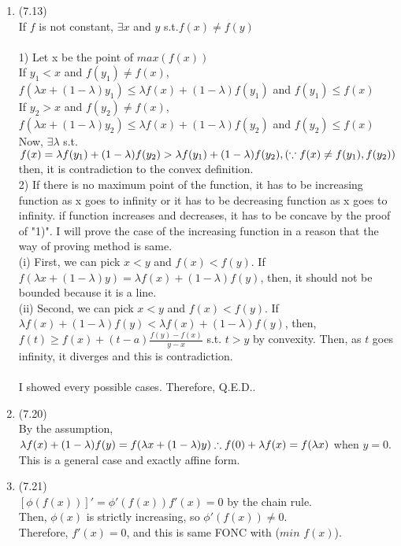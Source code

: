 \documentclass[letterpaper,12pt]{article}
\theoremstyle{definition}
\begin{document}
\begin{enumerate}
	\item (7.13) \\
If $f$ is not constant, $\exists x$ and $y $ s.t.$  f(x) \neq f(y)$\\ \\
1) Let x be the point of $max(f(x))$\\
If  $y_1 < x$ and $f(y_1) \neq f(x)$, $f(\lambda x + (1-\lambda)y_1) \leq \lambda f(x) + (1-\lambda) f(y_1)$ and $f(y_1) \leq f(x) $\\
If $y_2 > x$ and $ f(y_2) \neq f(x)$, $f(\lambda x + (1-\lambda)y_2) \leq \lambda f(x) + (1-\lambda) f(y_2)$ and $f(y_2) \leq f(x) $\\
Now, $\exists \lambda $ s.t. $ f(x) =\lambda f(y_1) + (1-\lambda) f(y_2) > \lambda f(y_1) + (1-\lambda) f(y_2), \\(\because f(x) \neq f(y_1), f(y_2))$\\ then, it is contradiction to the convex definition. \\

2) If there is no maximum point of the function, it has to be increasing function as x goes to infinity or it has to be decreasing function as x goes to infinity. if function increases and decreases, it has to be concave by the proof of "1)".  I will prove the case of the increasing function in a reason that the way of proving method is same.\\
(i) First, we can pick $x<y$ and $f(x) < f(y)$. If $ f(\lambda x + (1-\lambda)y) = \lambda f(x) + (1-\lambda)f(y)$, then, it should not be bounded because it is a line. \\
(ii) Second, we can pick $x<y$ and $f(x) < f(y)$. If $\lambda f(x) + (1-\lambda)f(y) <\lambda f(x) + (1-\lambda)f(y)$, then, $ f(t) \geq f(x) +(t-a)\frac{f(y) - f(x)}{y-x}$ s.t. $ t>y$ by convexity. Then, as $t$ goes infinity, it diverges and this is contradiction. \\
\\
I showed every possible cases. Therefore, Q.E.D..


	\item (7.20) \\
By the assumption, $\lambda f(x) + (1-\lambda) f(y) = f(\lambda x + (1-\lambda)y) \\
\therefore f(0) + \lambda f(x) = f(\lambda x) $ when $ y=0.$ \\
This is a general case and exactly affine form.

	\item (7.21) \\
$[\phi(f(x))]' = \phi ' (f(x))f'(x) = 0$ by the chain rule.\\
Then, $\phi(x)$ is strictly increasing, so $\phi '(f(x)) \neq 0$. \\
Therefore, $f'(x)=0$, and this is same FONC with ($min$  $f(x)$).










\end{enumerate}

\vspace{25mm}


\end{document}
